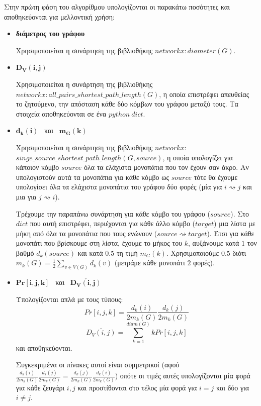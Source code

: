 \documentclass[10pt, letterpaper]{article}
\begin{document}
Στην πρώτη φάση του αλγορίθμου υπολογίζονται οι παρακάτω ποσότητες και αποθηκεύονται
για μελλοντική χρήση:
\begin{itemize}
    \item \textbf{διάμετρος του γράφου } 
    
    Χρησιμοποιείται η συνάρτηση της βιβλιοθήκης $networkx: diameter(G)$.
    
    \item  $\mathbf{D_V(i,j)}$
    
    Χρησιμοποιείται η συνάρτηση της βιβλιοθήκης $networkx: all\_pairs\_shortest\_path\_length(G)$,
    η οποία επιστρέφει απευθείας το ζητούμενο, την απόσταση κάθε δύο κόμβων του γράφου
    μεταξύ τους. Τα στοιχεία αποθηκεύονται σε ένα $python \ dict$.


    \item  $\mathbf{d_k(i)}$ \ και \ $\mathbf{m_G(k)}$
    
    Χρησιμοποιείται η συνάρτηση της βιβλιοθήκης $networkx:$ \\
    $ singe\_source\_shortest\_path\_length(G,source)$, η οποία υπολογίζει για κάποιον
    κόμβο $source$ όλα τα ελάχιστα μονοπάτια που τον έχουν σαν άκρο. Αν υπολογιστούν 
    αυτά τα μονοπάτια για κάθε κόμβο ως $source$ τότε θα έχουμε υπολογίσει
    όλα τα ελάχιστα μονοπάτια του γράφου δύο φορές (μία για $i \rightsquigarrow j$ και 
    μια για $j \rightsquigarrow i$).

    Τρέχουμε την παραπάνω συνάρτηση για κάθε κόμβο του γράφου ($source$). Στο $dict$ που 
    αυτή επιστρέφει, περιέχονται για κάθε άλλο κόμβο  ($target$) μια λίστα με μήκη από όλα
    τα μονοπάτια που τους ενώνουν ($source \rightsquigarrow target$). Έτσι για κάθε 
    μονοπάτι που βρίσκουμε στη λίστα, έχουμε το μήκος του $k$, 
    αυξάνουμε κατά $1$ τον βαθμό $d_k(source)$ και κατά $0.5$ τη τιμή 
    $m_G(k)$. Χρησιμοποιούμε $0.5$ διότι $m_k(G) = \frac{1}{2} \sum_{v \in V (G)} d_k(v)$
    (μετράμε κάθε μονοπάτι $2$ φορές).


    \item $\mathbf{Pr[i,j,k]}$  \ και \   $\mathbf{\overline{D_V(i,j)}}$
    
    Υπολογίζονται απλά με τους τύπους:
    \[ Pr[i,j,k] = \frac{d_k(i)}{2m_k(G)} \frac{d_k(j)}{2m_k(G)} \]
    \[ \overline{D_V(i,j)} = \sum_{k=1}^{diam(G)} k Pr[i,j,k] \]
    και αποθηκεύονται. 
    
    Συγκεκριμένα οι πίνακες αυτοί είναι συμμετρικοί (αφού 
    $\frac{d_k(i)}{2m_k(G)} \frac{d_k(j)}{2m_k(G)} = \frac{d_k(j)}{2m_k(G)} \frac{d_k(i)}{2m_k(G)}$)
    οπότε οι τιμές αυτές υπολογίζονται μία φορά για κάθε ζευγάρι $i,j$ και προστίθονται
    στο τέλος μία φορά για $i=j$ και δύο για $i \neq j$.
    


\end{itemize}
\end{document}
